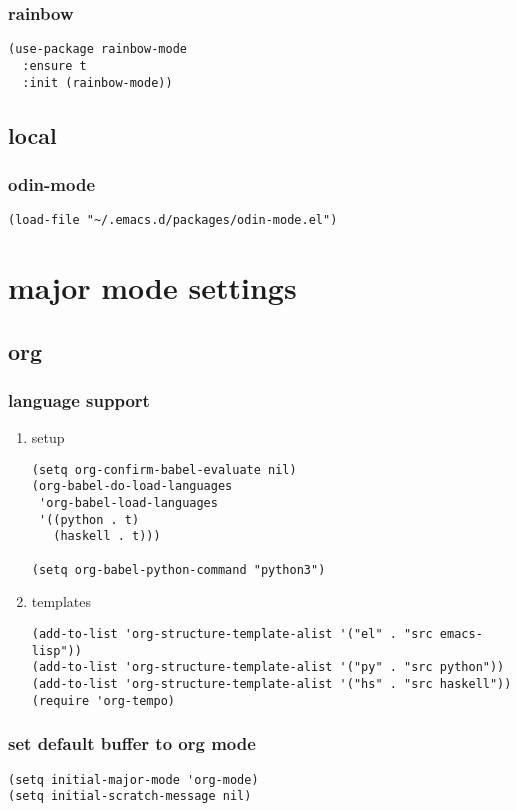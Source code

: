 \documentclass[11pt]{article}
\begin{document}
\subsubsection{rainbow}
\label{sec:orgce33d7a}
\begin{verbatim}
(use-package rainbow-mode
  :ensure t
  :init (rainbow-mode))
\end{verbatim}
\subsection{local}
\label{sec:org024fbb2}
\subsubsection{odin-mode}
\label{sec:orgb0815b0}
\begin{verbatim}
(load-file "~/.emacs.d/packages/odin-mode.el")
\end{verbatim}
\section{major mode settings}
\label{sec:org605c20d}
\subsection{org}
\label{sec:org2db6ecc}
\subsubsection{language support}
\label{sec:orgcba0c6d}
\begin{enumerate}
\item setup
\label{sec:orgfe0e5d4}
\begin{verbatim}
(setq org-confirm-babel-evaluate nil)
(org-babel-do-load-languages
 'org-babel-load-languages
 '((python . t)
   (haskell . t)))

(setq org-babel-python-command "python3")
\end{verbatim}
\item templates
\label{sec:org04998ea}
\begin{verbatim}
(add-to-list 'org-structure-template-alist '("el" . "src emacs-lisp"))
(add-to-list 'org-structure-template-alist '("py" . "src python"))
(add-to-list 'org-structure-template-alist '("hs" . "src haskell"))
(require 'org-tempo)
\end{verbatim}
\end{enumerate}
\subsubsection{set default buffer to org mode}
\label{sec:org7bbea35}
\begin{verbatim}
(setq initial-major-mode 'org-mode)
(setq initial-scratch-message nil)
\end{verbatim}
\end{document}
